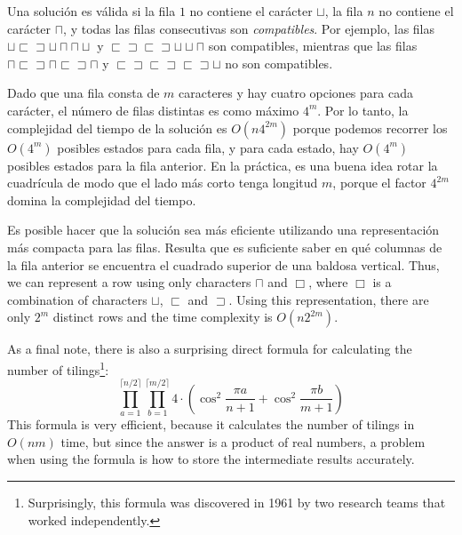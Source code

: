 Una solución es válida si la fila $1$ no contiene
el carácter $\sqcup$,
la fila $n$ no contiene el carácter $\sqcap$,
y todas las filas consecutivas son \emph{compatibles}.
Por ejemplo, las filas
$\sqcup \sqsubset \sqsupset \sqcup \sqcap \sqcap \sqcup$ y
$\sqsubset \sqsupset \sqsubset \sqsupset \sqcup \sqcup \sqcap$
son compatibles, mientras que las filas
$\sqcap \sqsubset \sqsupset \sqcap \sqsubset \sqsupset \sqcap$ y
$\sqsubset \sqsupset \sqsubset \sqsupset \sqsubset \sqsupset \sqcup$
no son compatibles.

Dado que una fila consta de $m$ caracteres y hay
cuatro opciones para cada carácter, el número de filas distintas
es como máximo $4^m$.
Por lo tanto, la complejidad del tiempo de la solución es
$O(n 4^{2m})$ porque podemos recorrer los
$O(4^m)$ posibles estados para cada fila,
y para cada estado, hay $O(4^m)$
posibles estados para la fila anterior.
En la práctica, es una buena idea rotar la cuadrícula
de modo que el lado más corto tenga longitud $m$,
porque el factor $4^{2m}$ domina la complejidad del tiempo.

Es posible hacer que la solución sea más eficiente
utilizando una representación más compacta para las filas.
Resulta que es suficiente saber en qué
columnas de la fila anterior se encuentra el cuadrado superior
de una baldosa vertical.
Thus, we can represent a row using only characters
$\sqcap$ and $\Box$, where $\Box$ is a combination
of characters
$\sqcup$, $\sqsubset$ and $\sqsupset$.
Using this representation, there are only
$2^m$ distinct rows and the time complexity is
$O(n 2^{2m})$.

As a final note, there is also a surprising direct formula
for calculating the number of tilings\footnote{Surprisingly,
this formula was discovered in 1961 by two research teams \cite{kas61,tem61}
that worked independently.}:
\[ \prod_{a=1}^{\lceil n/2 \rceil} \prod_{b=1}^{\lceil m/2 \rceil} 4 \cdot (\cos^2 \frac{\pi a}{n + 1} + \cos^2 \frac{\pi b}{m+1})\]
This formula is very efficient, because it calculates
the number of tilings in $O(nm)$ time,
but since the answer is a product of real numbers,
a problem when using the formula is
how to store the intermediate results accurately.


